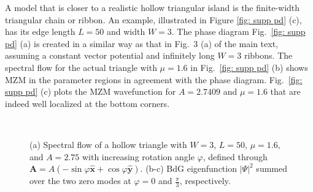 \documentclass[aps,prb,showpacs,amsmath,amssymb,superscriptaddress]{revtex4-2}
\let\oldhat\hat
\renewcommand{\hat}[1]{\oldhat{\mathbf{#1}}}
\begin{document}
A model that is closer to a realistic hollow triangular island is the finite-width triangular chain or ribbon. An example, illustrated in Figure \ref{fig: supp pd} (c), has its edge length $L=50$ and width $W=3$. The phase diagram Fig.~\ref{fig: supp pd} (a) is created in a similar way as that in Fig.~3 (a) of the main text, assuming a constant vector potential and infinitely long $W=3$ ribbons. The spectral flow for the actual triangle with $\mu = 1.6$ in Fig.~\ref{fig: supp pd} (b) shows MZM in the parameter regions in agreement with the phase diagram. Fig.~\ref{fig: supp pd} (c) plots the MZM wavefunction for $A=2.7409$ and $\mu=1.6$ that are indeed well localized at the bottom corners.

\begin{figure}[ht]
  \hspace{-20pt}
  \\
  \caption{(a) Spectral flow of a hollow triangle with $W=3$, $L=50$, $\mu=1.6$, and $A=2.75$ with increasing rotation angle $\varphi$, defined through $\mathbf A = A(-\sin\varphi \hat{x} + \cos\varphi \hat{y})$. (b-c) BdG eigenfunction $|\Psi|^2$ summed over the two zero modes at $\varphi = 0$ and $\frac{\pi}{3}$, respectively.}
  \label{fig: supp rotation}
\end{figure}
\end{document}
